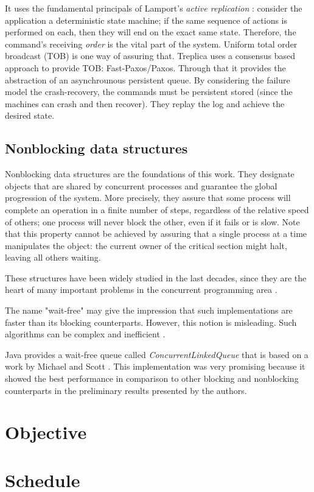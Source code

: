 \documentclass[12pt,twoside,a4paper]{article}
\begin{document}
 It uses the fundamental principals of Lamport's \textit{active replication} \cite{Lamport1978}: consider the application a deterministic state machine; if the same sequence of actions is performed on each, then they will end on the exact same state. Therefore, the command's receiving \textit{order} is the vital part of the system. Uniform total order broadcast (TOB) is one way of assuring that. Treplica uses a consensus based approach to provide TOB: Fast-Paxos/Paxos. Through that it provides the abstraction of an asynchrounous persistent queue.
By considering the failure model the crash-recovery, the commands must be persistent stored (since the machines can crash and then recover). They replay the log and achieve the desired state.


\subsection{Nonblocking data structures}
Nonblocking data structures are the foundations of this work. They designate
objects that are shared by concurrent processes and guarantee the global
progression of the system. More precisely, they  assure that some process will
complete an operation in a finite number of steps, regardless of the relative
speed of others; one process will never block the other, even if it fails or is
slow. Note that this  property cannot be achieved by assuring that a single
process at a time manipulates the object: the current owner of the critical
section might halt, leaving all others waiting.

These structures have been widely studied in the last decades, since they are
the heart of many important problems in the concurrent programming area
\cite{herlihy2011art}.

The name "wait-free" may give the impression that such implementations are
faster than its blocking counterparts. However, this notion is misleading.  Such
algorithms can be complex and inefficient \cite{attiya1994wait}.

Java provides a wait-free queue called \textit{ConcurrentLinkedQueue} that is
based on a work by Michael and Scott \cite{michael1996simple}. This
implementation was very promising because it showed the best performance in
comparison to other blocking and nonblocking counterparts in the preliminary
results presented by the authors.


\section{Objective}
\label{sec:contrib}



\section{Schedule}
\label{sec:schedule}


\vskip 15mm

{}

\end{document}
